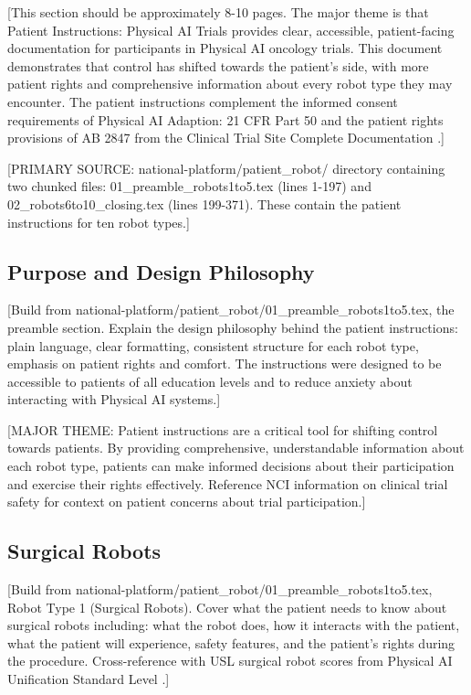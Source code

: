 
[This section should be approximately 8-10 pages. The major theme is that
Patient Instructions: Physical AI Trials \cite{patient-instructions-paper}
provides clear, accessible, patient-facing documentation for participants in
Physical AI oncology trials. This document demonstrates that control has shifted
towards the patient's side, with more patient rights and comprehensive
information about every robot type they may encounter. The patient instructions
complement the informed consent requirements of Physical AI Adaption: 21 CFR
Part 50 \cite{cfr50-adapt} and the patient rights provisions of AB 2847 from
the Clinical Trial Site Complete Documentation \cite{site-docs}.]

[PRIMARY SOURCE: national-platform/patient\_robot/ directory containing two
chunked files: 01\_preamble\_robots1to5.tex (lines 1-197) and
02\_robots6to10\_closing.tex (lines 199-371). These contain the patient
instructions for ten robot types.]

\subsection{Purpose and Design Philosophy}
\label{subsec:instructions-purpose}

[Build from national-platform/patient\_robot/01\_preamble\_robots1to5.tex,
the preamble section. Explain the design philosophy behind the patient
instructions: plain language, clear formatting, consistent structure for each
robot type, emphasis on patient rights and comfort. The instructions were
designed to be accessible to patients of all education levels and to reduce
anxiety about interacting with Physical AI systems.]

[MAJOR THEME: Patient instructions are a critical tool for shifting control
towards patients. By providing comprehensive, understandable information
about each robot type, patients can make informed decisions about their
participation and exercise their rights effectively. Reference NCI information
on clinical trial safety \cite{nci-trials-safety} for context on patient
concerns about trial participation.]

\subsection{Surgical Robots}
\label{subsec:instructions-surgical}

[Build from national-platform/patient\_robot/01\_preamble\_robots1to5.tex,
Robot Type 1 (Surgical Robots). Cover what the patient needs to know about
surgical robots including: what the robot does, how it interacts with the
patient, what the patient will experience, safety features, and the patient's
rights during the procedure. Cross-reference with USL surgical robot scores
from Physical AI Unification Standard Level \cite{usl-standard}.]

